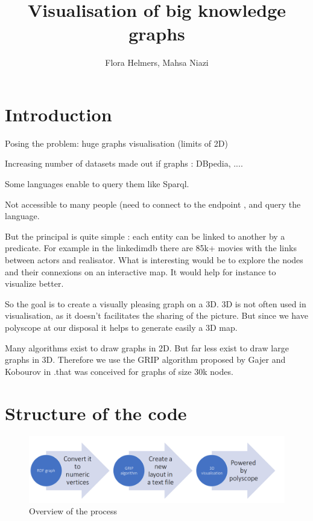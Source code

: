 \documentclass{article}
\title{Visualisation of big knowledge graphs}
\author{Flora Helmers, Mahsa Niazi}
\begin{document}
\maketitle

\section*{Introduction}
Posing the problem:
huge graphs 
visualisation (limits of 2D)



Increasing number of datasets made out if graphs : DBpedia, ....

Some languages enable to query them like Sparql. 

Not accessible to many people (need to connect to the endpoint , and query the language. 

But the principal is quite simple : each entity can be linked to another by a predicate. For example in the linkedimdb there are 85k+ movies with the links between actors and realisator. 
What is interesting would be to explore the nodes and their connexions on an interactive map. It would help for instance to visualize better.

So the goal is to create a visually pleasing graph on a 3D. 
3D is not often used in visualisation, as it doesn't facilitates the sharing of the picture. But since we have polyscope at our disposal it helps to generate easily a 3D map. 

Many algorithms exist to draw graphs in 2D. But far less exist to draw large graphs in 3D. Therefore we use the GRIP algorithm proposed by Gajer and Kobourov in \cite{gajer00}.that was conceived for graphs of size 30k nodes.  


\section{Structure of the code}

\begin{figure}[h!]
    \includegraphics[width=\textwidth]{process.png}
    \caption{Overview of the process}
\end{figure}
\end{document}
